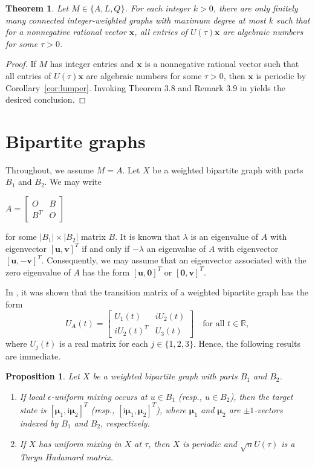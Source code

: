 \documentclass[11pt]{article}
\newtheorem{theorem}{Theorem}
\newtheorem{proposition}{Proposition}
\newcommand{\bv}{\mathbf v}
\newcommand{\bu}{\mathbf u}
\newcommand{\bx}{\mathbf x}
\newcommand{\bmu}{{\boldsymbol{\mu}}}
\newcommand{\zero}{\mathbf 0}
\def\ii{\mathrm{i}}
\def\R{\mathbb{R}}
\begin{document}
\begin{theorem}
\label{raregen}
Let $M\in\{A,L,Q\}$. For each integer $k>0$, there are only finitely many connected integer-weighted graphs with maximum degree at most $k$ such that for a nonnegative rational vector $\bx$, all entries of $U(\tau)\bx$ are algebraic numbers for some $\tau>0$.
\end{theorem}
\begin{proof}
If $M$ has integer entries and $\bx$ is a nonnegative rational vector such that all entries of $U(\tau)\bx$ are algebraic numbers for some $\tau>0$, then $\bx$ is periodic by Corollary~\ref{cor:lumper}. Invoking Theorem 3.8 and Remark 3.9 in \cite{godsil2025perfect} yields the desired conclusion.
\end{proof}

\section{Bipartite graphs}\label{sec:bip}

Throughout, we assume $M=A$. Let $X$ be a weighted bipartite graph with parts $B_1$ and $B_2$. We may write
\begin{center}
 $A=\left[\begin{array}{ccc} O&B \\ B^T&O \end{array} \right]$
\end{center}
for some $|B_1|\times |B_2|$ matrix $B$. It is known that $\lambda$ is an eigenvalue of $A$ with eigenvector $[\bu,\bv]^T$ if and only if $-\lambda$ an eigenvalue of $A$ with eigenvector $[\bu,-\bv]^T$. Consequently, we may assume that an eigenvector associated with the zero eigenvalue of $A$ has the form $[\bu,\zero]^T$ or $[\zero,\bv]^T$. 

In \cite{Godsil2013}, it was shown that the transition matrix of a weighted bipartite graph has the form
\begin{equation}
\label{Eq:bip}
U_A(t)=\left[\begin{array}{ccc} U_1(t)&iU_2(t) \\ iU_2(t)^T&U_3(t) \end{array} \right]\quad \text{for all $t\in\R$},
\end{equation}
where $U_j(t)$ is a real matrix for each $j\in\{1,2,3\}$. Hence, the following results are immediate.

\begin{proposition}
\label{1}
Let $X$ be a weighted bipartite graph with parts $B_1$ and $B_2$.
\begin{enumerate}
\item If local $\epsilon$-uniform mixing occurs at $u\in B_1$ (resp., $u\in B_2$), then the target state is $[\bmu_1,\ii\bmu_2]^T$ (resp., $[\ii\bmu_1,\bmu_2]^T$), where $\bmu_1$ and $\bmu_2$ are $\pm 1$-vectors indexed by $B_1$ and $B_2$, respectively.
\item If $X$ has uniform mixing in $X$ at $\tau$, then $X$ is periodic and $\sqrt{n}U(\tau)$ is a Turyn Hadamard matrix.
\end{enumerate}
\end{proposition}
\end{document}
